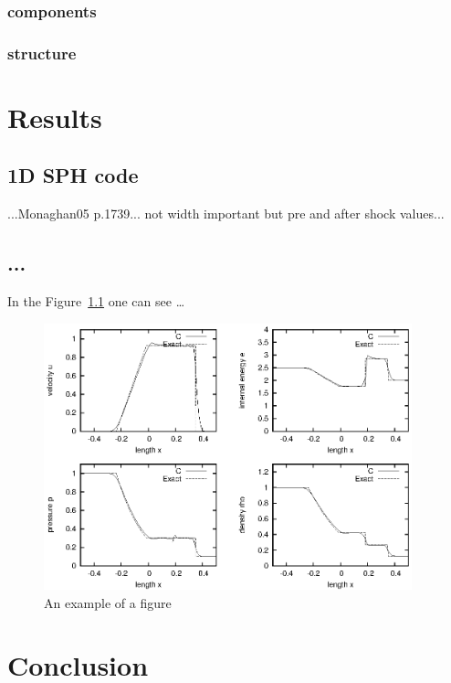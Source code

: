\documentclass{report}
\begin{document}
\subsection{components}

\subsection{structure}



\chapter{Results}
\section{1D SPH code}
...Monaghan05 p.1739... not width important but pre and after shock values...

\section{...}
\label{sec:results}

In the Figure~\ref{fig:1dshock} one can see \ldots

\begin{figure}[h]
  \centering
  \includegraphics[width=0.95\textwidth]{img/1dshock.eps}
  \caption{An example of a figure}
  \label{fig:1dshock}
\end{figure}





\chapter{Conclusion}
\label{sec:conclusion}

\listoffigures



\end{document}
